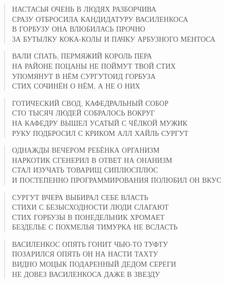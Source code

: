 \poemtitle{***}
\begin{verse}
НАСТАСЬЯ ОЧЕНЬ В ЛЮДЯХ РАЗБОРЧИВА\\
СРАЗУ ОТБРОСИЛА КАНДИДАТУРУ ВАСИЛЕНКОСА\\
В ГОРБУЗУ ОНА ВЛЮБИЛАСЬ ПРОЧНО\\
ЗА БУТЫЛКУ КОКА-КОЛЫ И ПАЧКУ АРБУЗНОГО МЕНТОСА
\end{verse}

\poemtitle{***}
\begin{verse}
ВАЛИ СПАТЬ, ПЕРМЯЖИЙ КОРОЛЬ ПЕРА\\
НА РАЙОНЕ ПОЦАНЫ НЕ ПОЙМУТ ТВОЙ СТИХ\\
УПОМЯНУТ В НЁМ СУРГУТОИД ГОРБУЗА\\
СТИХ СОЧИНЁН О НЁМ, А НЕ О НИХ
\end{verse}

\poemtitle{***}
\begin{verse}
ГОТИЧЕСКИЙ СВОД, КАФЕДРАЛЬНЫЙ СОБОР\\
СТО ТЫСЯЧ ЛЮДЕЙ СОБРАЛОСЬ ВОКРУГ\\
НА КАФЕДРУ ВЫШЕЛ УСАТЫЙ С ЧЁЛКОЙ МУЖИК\\
РУКУ ПОДБРОСИЛ С КРИКОМ АЛЛ ХАЙЛЬ СУРГУТ
\end{verse}

\poemtitle{***}
\begin{verse}
ОДНАЖДЫ ВЕЧЕРОМ РЕБЁНКА ОРГАНИЗМ\\
НАРКОТИК СГЕНЕРИЛ В ОТВЕТ НА ОНАНИЗМ\\
СТАЛ ИЗУЧАТЬ ТОВАРИЩ СИПЛЮСПЛЮС\\
И ПОСТЕПЕННО ПРОГРАММИРОВАНИЯ ПОЛЮБИЛ ОН ВКУС
\end{verse}

\poemtitle{***}
\begin{verse}
СУРГУТ ВЧЕРА ВЫБИРАЛ СЕБЕ ВЛАСТЬ \\
СТИХИ С БЕЗЫСХОДНОСТИ ЛЮДИ СЛАГАЮТ\\
СТИХ ГОРБУЗЫ В ПОНЕДЕЛЬНИК ХРОМАЕТ\\
БЕЗДЕЛЬЕ С ПОХМЕЛЬЯ ТИМУРКА НЕ ВСЛАСТЬ
\end{verse}

\poemtitle{***}
\begin{verse}
ВАСИЛЕНКОС ОПЯТЬ ГОНИТ ЧЬЮ-ТО ТУФТУ\\
ПОЗАРИЛСЯ ОПЯТЬ ОН НА НАСТИ ТАХТУ\\
ВИДНО МОЦЫК ПОДАРЕННЫЙ ДЕДОМ СЕРЕГИ\\
НЕ ДОВЕЗ ВАСИЛЕНКОСА ДАЖЕ В ЗВЕЗДУ
\end{verse}

